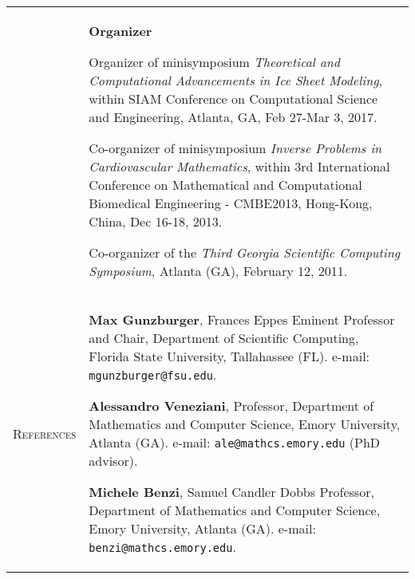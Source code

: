 \documentclass[10pt]{article}
\begin{document}
\begin{tabular}{p{2.5cm}|p{15.5cm}}

&
\textbf{Organizer}

\vspace*{0.1cm}
Organizer of minisymposium \textit{Theoretical and Computational Advancements in Ice Sheet Modeling}, within SIAM Conference on Computational Science and Engineering, Atlanta, GA, Feb 27-Mar 3, 2017.

\vspace*{0.2cm}
Co-organizer of minisymposium \textit{Inverse Problems in Cardiovascular Mathematics}, within 3rd International Conference on Mathematical and Computational Biomedical Engineering - CMBE2013, Hong-Kong, China, Dec 16-18, 2013.

\vspace*{0.2cm}
Co-organizer of the \textit{Third Georgia Scientific Computing Symposium}, Atlanta (GA), February 12, 2011.
\vspace*{0.2cm}
\\
\textsc{References} & \textbf{Max Gunzburger}, Frances Eppes Eminent Professor and Chair, Department of Scientific Computing, Florida State University, Tallahassee (FL). e-mail: \verb|mgunzburger@fsu.edu|.

\vspace*{0.1cm}
\textbf{Alessandro Veneziani}, Professor, Department of Mathematics and Computer Science, Emory University, Atlanta (GA). e-mail: \verb|ale@mathcs.emory.edu| (PhD advisor).

\vspace*{0.1cm}
\textbf{Michele Benzi}, Samuel Candler Dobbs Professor, Department of Mathematics and Computer Science, Emory University, Atlanta (GA). e-mail: \verb|benzi@mathcs.emory.edu|.
\end{tabular}
\end{document}
